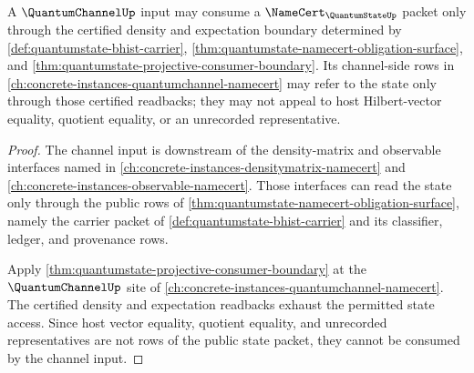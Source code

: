 \begin{theorem}
\label{thm:quantumstate-quantumchannel-input-readback}
A $\QuantumChannelUp$ input may consume a $\NameCert_{\QuantumStateUp}$ packet
only through the certified density and expectation boundary determined by
\autoref{def:quantumstate-bhist-carrier},
\autoref{thm:quantumstate-namecert-obligation-surface}, and
\autoref{thm:quantumstate-projective-consumer-boundary}. Its channel-side
rows in \autoref{ch:concrete-instances-quantumchannel-namecert} may refer to
the state only through those certified readbacks; they may not appeal to host
Hilbert-vector equality, quotient equality, or an unrecorded representative.
\end{theorem}
\begin{proof}
The channel input is downstream of the density-matrix and observable
interfaces named in \autoref{ch:concrete-instances-densitymatrix-namecert} and
\autoref{ch:concrete-instances-observable-namecert}. Those interfaces can read
the state only through the public rows of
\autoref{thm:quantumstate-namecert-obligation-surface}, namely the carrier
packet of \autoref{def:quantumstate-bhist-carrier} and its classifier,
ledger, and provenance rows.

Apply \autoref{thm:quantumstate-projective-consumer-boundary} at the
$\QuantumChannelUp$ site of
\autoref{ch:concrete-instances-quantumchannel-namecert}. The certified
density and expectation readbacks exhaust the permitted state access. Since
host vector equality, quotient equality, and unrecorded representatives are
not rows of the public state packet, they cannot be consumed by the channel
input.
\end{proof}

